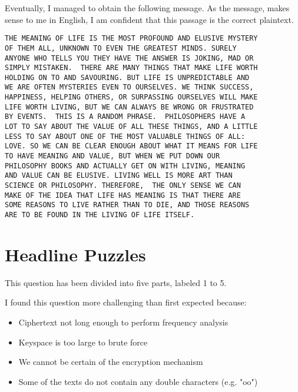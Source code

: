 \documentclass[12pt,a4paper,twoside]{article}
\begin{document}
Eventually, I managed to obtain the following message. As the message, makes
sense to me in English, I am confident that this passage is the correct
plaintext. 

\begin{lstlisting}
THE MEANING OF LIFE IS THE MOST PROFOUND AND ELUSIVE MYSTERY
OF THEM ALL, UNKNOWN TO EVEN THE GREATEST MINDS. SURELY
ANYONE WHO TELLS YOU THEY HAVE THE ANSWER IS JOKING, MAD OR
SIMPLY MISTAKEN.  THERE ARE MANY THINGS THAT MAKE LIFE WORTH
HOLDING ON TO AND SAVOURING. BUT LIFE IS UNPREDICTABLE AND
WE ARE OFTEN MYSTERIES EVEN TO OURSELVES. WE THINK SUCCESS,
HAPPINESS, HELPING OTHERS, OR SURPASSING OURSELVES WILL MAKE
LIFE WORTH LIVING, BUT WE CAN ALWAYS BE WRONG OR FRUSTRATED
BY EVENTS.  THIS IS A RANDOM PHRASE.  PHILOSOPHERS HAVE A
LOT TO SAY ABOUT THE VALUE OF ALL THESE THINGS, AND A LITTLE
LESS TO SAY ABOUT ONE OF THE MOST VALUABLE THINGS OF ALL:
LOVE. SO WE CAN BE CLEAR ENOUGH ABOUT WHAT IT MEANS FOR LIFE
TO HAVE MEANING AND VALUE, BUT WHEN WE PUT DOWN OUR
PHILOSOPHY BOOKS AND ACTUALLY GET ON WITH LIVING, MEANING
AND VALUE CAN BE ELUSIVE. LIVING WELL IS MORE ART THAN
SCIENCE OR PHILOSOPHY. THEREFORE,  THE ONLY SENSE WE CAN
MAKE OF THE IDEA THAT LIFE HAS MEANING IS THAT THERE ARE
SOME REASONS TO LIVE RATHER THAN TO DIE, AND THOSE REASONS
ARE TO BE FOUND IN THE LIVING OF LIFE ITSELF.
\end{lstlisting}


\section{Headline Puzzles}
This question has been divided into five parts, labeled 1 to 5.

I found this question more challenging than first expected because:
\begin{itemize}
\item Ciphertext not long enough to perform frequency analysis
\item Keyspace is too large to brute force
\item We cannot be certain of the encryption mechanism
\item Some of the texts do not contain any double characters (e.g. "oo")
\end{itemize}


%
%
%



\end{document}
